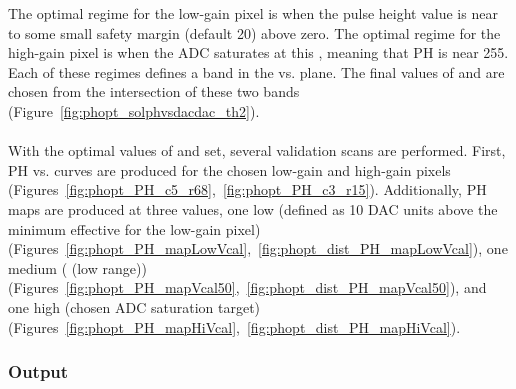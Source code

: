 The optimal regime for the low-gain pixel is when the pulse height value is near to some small safety margin (default 20) above zero.
The optimal regime for the high-gain pixel is when the ADC saturates at this \vcal, meaning that PH is near 255.
Each of these regimes defines a band in the \phoffset vs. \phscale plane.
The final values of \phscale and \phoffset are chosen from the intersection of these two bands (Figure~\ref{fig:phopt_solphvsdacdac_th2}).
\\\\
With the optimal values of \phscale and \phoffset set, several validation scans are performed.
First, PH vs. \vcal curves are produced for the chosen low-gain and high-gain pixels
(Figures~\ref{fig:phopt_PH_c5_r68},~\ref{fig:phopt_PH_c3_r15}).
Additionally, PH maps are produced at three \vcal values,
one low (defined as 10 DAC units above the minimum effective \vcal for the low-gain pixel)
(Figures~\ref{fig:phopt_PH_mapLowVcal},~\ref{fig:phopt_dist_PH_mapLowVcal}),
one medium ( (low range))
(Figures~\ref{fig:phopt_PH_mapVcal50},~\ref{fig:phopt_dist_PH_mapVcal50}),
and one high (chosen ADC saturation target)
(Figures~\ref{fig:phopt_PH_mapHiVcal},~\ref{fig:phopt_dist_PH_mapHiVcal}).

\subsubsection{Output}


